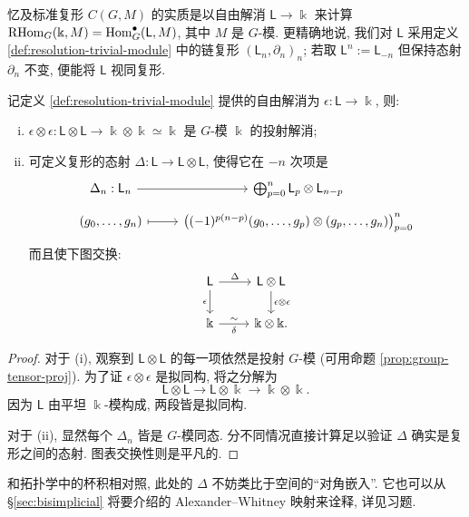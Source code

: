 忆及标准复形 $C(G, M)$ 的实质是以自由解消 $\mathsf{L} \to \Bbbk$ 来计算 $\operatorname{RHom}_G(\Bbbk, M) = \operatorname{Hom}^\bullet_G(\mathsf{L}, M)$, 其中 $M$ 是 $G$-模. 更精确地说, 我们对 $\mathsf{L}$ 采用定义 \ref{def:resolution-trivial-module} 中的链复形 $(\mathsf{L}_n, \partial_n)_n$; 若取 $\mathsf{L}^n := \mathsf{L}_{-n}$ 但保持态射 $\partial_n$ 不变, 便能将 $\mathsf{L}$ 视同复形.

\begin{lemma}\label{prop:cup-resolution}
	记定义 \ref{def:resolution-trivial-module} 提供的自由解消为 $\epsilon: \mathsf{L} \to \Bbbk$, 则:
	\begin{enumerate}[(i)]
		\item $\epsilon \otimes \epsilon: \mathsf{L} \otimes \mathsf{L} \to \Bbbk \otimes \Bbbk \simeq \Bbbk$ 是 $G$-模 $\Bbbk$ 的投射解消;
		\item 可定义复形的态射 $\Delta: \mathsf{L} \to \mathsf{L} \otimes \mathsf{L}$, 使得它在 $-n$ 次项是
		\[\begin{tikzcd}[row sep=tiny]
			\Delta_n: \mathsf{L}_n \arrow[r] & \bigoplus_{p=0}^n \mathsf{L}_p \otimes \mathsf{L}_{n-p} \\
			(g_0, \ldots, g_n) \arrow[mapsto, r] & \left( (-1)^{p(n-p)} (g_0, \ldots, g_p) \otimes (g_p, \ldots, g_n) \right)_{p=0}^n
		\end{tikzcd}\]
		而且使下图交换:
		\[\begin{tikzcd}
			\mathsf{L} \arrow[r, "\Delta"] \arrow[d, "\epsilon"'] & \mathsf{L} \otimes \mathsf{L} \arrow[d, "{\epsilon \otimes \epsilon}"] \\
			\Bbbk \arrow[r, "\sim", "\delta"'] & \Bbbk \otimes \Bbbk .
		\end{tikzcd}\]
	\end{enumerate}
\end{lemma}
\begin{proof}
	对于 (i), 观察到 $\mathsf{L} \otimes \mathsf{L}$ 的每一项依然是投射 $G$-模 (可用命题 \ref{prop:group-tensor-proj}). 为了证 $\epsilon \otimes \epsilon$ 是拟同构, 将之分解为
	\[ \mathsf{L} \otimes \mathsf{L} \to \mathsf{L} \otimes \Bbbk \to \Bbbk \otimes \Bbbk. \]
	因为 $\mathsf{L}$ 由平坦 $\Bbbk$-模构成, 两段皆是拟同构.
	
	对于 (ii), 显然每个 $\Delta_n$ 皆是 $G$-模同态. 分不同情况直接计算足以验证 $\Delta$ 确实是复形之间的态射. 图表交换性则是平凡的.
\end{proof}

和拓扑学中的杯积相对照, 此处的 $\Delta$ 不妨类比于空间的``对角嵌入''. 它也可以从 \S\ref{sec:bisimplicial} 将要介绍的 Alexander--Whitney 映射来诠释, 详见习题.

